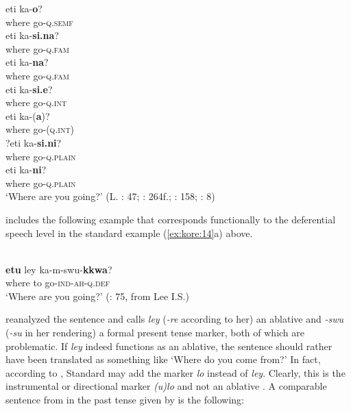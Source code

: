     \ex
    \gll eti  ka-\textbf{{o}}?\\
    where  go-\textsc{q}.\textsc{semf}\\
    
    \ex
    \gll eti  ka-\textbf{{si.na}}?\\
    where  go-\textsc{q}.\textsc{fam}\\
    
    \ex
    \gll eti  ka-\textbf{{na}}?\\
    where  go-\textsc{q}.\textsc{fam}\\
    
    \ex
    \gll eti  ka-\textbf{{si.e}}?\\
    where  go-\textsc{q}.\textsc{int}\\
    
    \ex
    \gll eti  ka-(\textbf{{a}})?\\
    where  go-(\textsc{q}.\textsc{int)}\\
    
    \ex
    \gll ?eti  ka-\textbf{{si.ni}}?\\
    where  go-\textsc{q}.\textsc{plain}\\
    
    \ex
    \gll eti  ka-\textbf{{ni}}?\\
    where  go-\textsc{q}.\textsc{plain}\\
    \glt ‘Where are you going?’ (L. \citealt{Brown2011}: 47; \citealt{Lee2000}: 264f.;   \citealt{Song2005}: 158; \citealt{YeonBrown2011}: 8)
    \z
    \z

\citet{Sohn1999} includes the following  example that corresponds functionally to the deferential speech level in the standard  example (\ref{ex:kore:14}a) above.

\ea%
    \label{ex:kore:15}
    \\
    \gll \textbf{{etu}} ley  ka-m-swu-\textbf{{kkwa}}?\\
    where  to  go-\textsc{ind}-\textsc{ah}-\textsc{q}.\textsc{def}\\
    \glt ‘Where are you going?’ (\citealt{Sohn1999}: 75, from Lee I.S.)
    \z

\noindent \citet[49]{Saltzman2014} reanalyzed the sentence and calls \textit{ley} (\textit{-re} according to her) an ablative and \textit{-swu} (\textit{-su} in her rendering) a formal present tense marker, both of which are problematic. If \textit{ley} indeed functions as an ablative, the sentence should rather have been translated as something like ‘Where do you come from?’ In fact, according to \citet[75]{Sohn1999}, Standard  may add the marker \textit{lo} instead of \textit{ley}. Clearly, this is the instrumental or directional  marker \textit{(u)lo} and not an ablative \citep[115]{Song2005}. A comparable sentence from  in the past tense given by \citet{Kiaer2014} is the following:

